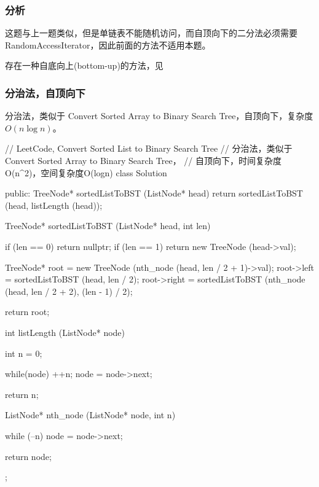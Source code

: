 \subsubsection{分析}
这题与上一题类似，但是单链表不能随机访问，而自顶向下的二分法必须需要RandomAccessIterator，因此前面的方法不适用本题。

存在一种自底向上(bottom-up)的方法，见


\subsubsection{分治法，自顶向下}
分治法，类似于 Convert Sorted Array to Binary Search Tree，自顶向下，复杂度$O(n\log n)$。
\begin{Code}
// LeetCode, Convert Sorted List to Binary Search Tree
// 分治法，类似于 Convert Sorted Array to Binary Search Tree，
// 自顶向下，时间复杂度O(n^2)，空间复杂度O(logn)
class Solution {
public:
    TreeNode* sortedListToBST (ListNode* head) {
        return sortedListToBST (head, listLength (head));
    }

    TreeNode* sortedListToBST (ListNode* head, int len) {
        if (len == 0) return nullptr;
        if (len == 1) return new TreeNode (head->val);

        TreeNode* root = new TreeNode (nth_node (head, len / 2 + 1)->val);
        root->left = sortedListToBST (head, len / 2);
        root->right = sortedListToBST (nth_node (head, len / 2 + 2), 
                (len - 1) / 2);

        return root;
    }

    int listLength (ListNode* node) {
        int n = 0;

        while(node) {
            ++n;
            node = node->next;
        }

        return n;
    }

    ListNode* nth_node (ListNode* node, int n) {
        while (--n)
            node = node->next;

        return node;
    }
};
\end{Code}


